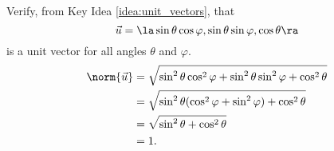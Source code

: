 {Verify, from Key Idea \ref{idea:unit_vectors}, that $$\vec u=\la \sin\theta\cos\varphi,\sin\theta\sin\varphi,\cos\theta\ra$$ is a unit vector for all angles $\theta$ and $\varphi$.
}
{\begin{align*}
\norm{\vec u} &= \sqrt{\sin^2\theta\cos^2\varphi+\sin^2\theta\sin^2\varphi+\cos^2\theta}\\
						&= \sqrt{\sin^2\theta(\cos^2\varphi+\sin^2\varphi)+\cos^2\theta}\\
						&= \sqrt{\sin^2\theta+\cos^2\theta}\\
						&=1.
\end{align*}
}
